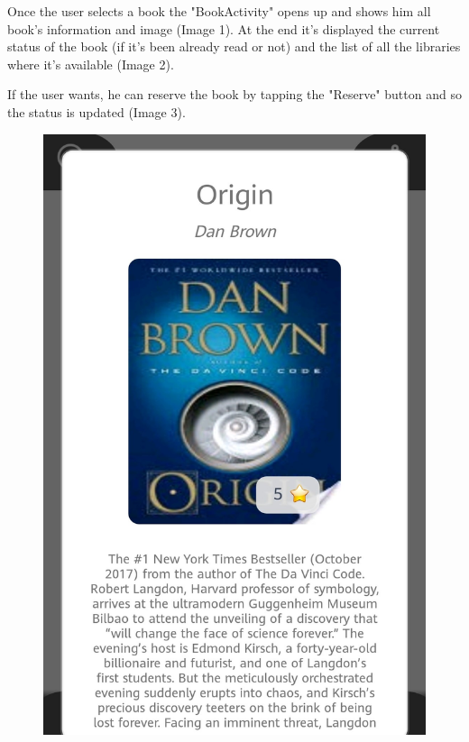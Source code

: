 \newpage
{}
Once the user selects a book the "BookActivity" opens up and shows him all book's information and image (Image 1). At the end it's displayed the current status of the book (if it's been already read or not) and the list of all the libraries where it's available (Image 2).\par
If the user wants, he can reserve the book by tapping the "Reserve" button and so the status is updated (Image 3).
\begin{figure}[H]
	\centering
	\includegraphics[scale=0.15]{Images/UI/Book/1}
	\hspace{0.5cm}

\end{figure}
